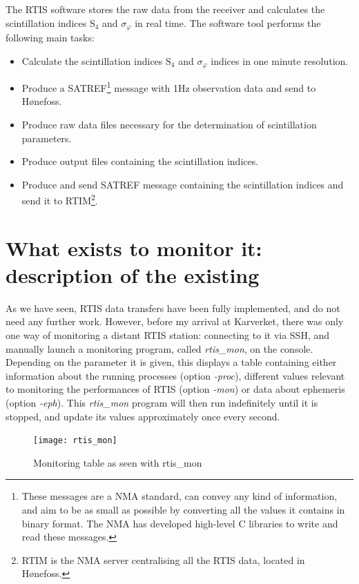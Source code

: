 \documentclass{themeensg}
\begin{document}
The RTIS software stores the raw data from the receiver and calculates the scintillation indices $\text{S}_{\text{4}}$ and $\sigma_\varphi$ in real time. 
The software tool performs the following main tasks:
\begin{itemize}
\item Calculate the scintillation indices $\text{S}_{\text{4}}$ and $\sigma_\varphi$ indices in one minute resolution.
\item Produce a SATREF\footnote{These messages are a NMA standard, can convey any kind of information, and aim to be as small as possible by converting all the values it contains in binary format. The NMA has developed high-level C libraries to write and read these messages.} message with 1Hz observation data and send to Hønefoss.
\item Produce raw data files necessary for the determination of scintillation parameters.
\item Produce output files containing the scintillation indices. 
\item Produce and send SATREF message containing the scintillation indices and send it to RTIM\footnote{RTIM is the NMA server centralising all the RTIS data, located in Hønefoss.}.
\end{itemize}

\clearpage

\section{What exists to monitor it: description of the existing}

As we have seen, RTIS data transfers have been fully implemented, and do not need any further work. However, before my arrival at Karverket, there was only one way of monitoring a distant RTIS station: connecting to it via SSH, and manually launch a monitoring program, called \textit{rtis\_mon}, on the console. Depending on the parameter it is given, this displays a table containing either information about the running processes (option \textit{-proc}), different values relevant to monitoring the performances of RTIS (option \textit{-mon}) or data about ephemeris (option \textit{-eph}). This \textit{rtis\_mon} program will then run indefinitely until it is stopped, and update its values approximately once every second.\\

\begin{figure}[ht]
	\centering
	\texttt{[image: rtis\_mon]}
	\caption{Monitoring table as seen with rtis\_mon}
\end{figure}
\end{document}
